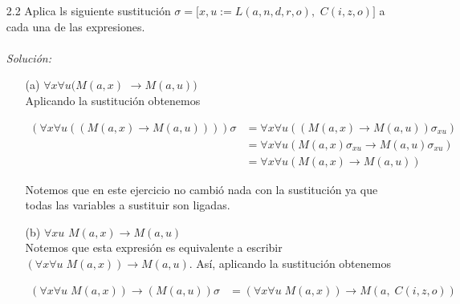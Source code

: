 \documentclass[letterpaper,11pt]{article}
\begin{document}
\begin{enumerate}
\begin{itemize}
\begin{enumerate}
                \item[2.2] Aplica ls siguiente sustitución 
                $\sigma = [x, u := L(a,n,d,r,o),$ $C(i,z,o)]$ a cada una 
                de las expresiones. \\ \\
                \textit{Solución:}
                
                \begin{itemize}
                    \item[(a)] $\forall x \forall u (M(a,x)$ 
                    $\rightarrow M(a,u))$ \\
                    Aplicando la sustitución obtenemos 
                    
                    \begin{align*}
                        (\forall x \forall u ((M(a,x) 
                        \rightarrow M(a,u)))) \sigma
                        &= \forall x \forall u ((M(a,x) 
                        \rightarrow M(a,u)) \sigma_{xu}) \\
                        &= \forall x \forall u (M(a,x) \sigma_{xu} 
                        \rightarrow M(a,u) \sigma_{xu}) \\
                        &= \forall x \forall u (M(a,x) \rightarrow M(a,u))
                    \end{align*}

                    Notemos que en este ejercicio no cambió nada con la 
                    sustitución ya que todas las variables a sustituir son 
                    ligadas. 

                    \item[(b)] $\forall xu$ $M(a,x) \rightarrow M(a,u)$ \\
                    Notemos que esta expresión es equivalente a escribir 
                    $(\forall x \forall u \; M(a,x)) \rightarrow M(a,u)$. Así,
                    aplicando la sustitución obtenemos 
                    
                    \begin{align*}
                        (\forall x \forall u \; M(a,x)) 
                        \rightarrow (M(a,u)) \sigma
                        &= (\forall x \forall u \; M(a,x))
                        \rightarrow M(a, \; C(i,z,o)) 
                    \end{align*}


\end{itemize}
\end{enumerate}
\end{itemize}
\end{enumerate}
\end{document}
